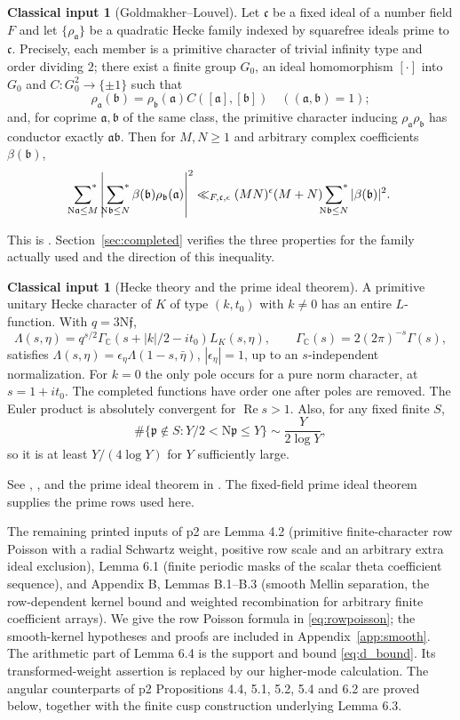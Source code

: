\documentclass[11pt,a4paper]{article}
\numberwithin{equation}{section}
\theoremstyle{definition}
\newtheorem{inputthm}[theorem]{Classical input}
\theoremstyle{remark}
\newcommand{\C}{\mathbb C}
\newcommand{\N}{\mathrm N}
\newcommand{\Rea}{\operatorname{Re}}
\newcommand{\sfstar}{\sideset{}{^*}\sum}
\newcommand{\GC}{\Gamma_{\C}}
\begin{document}
\begin{inputthm}[Goldmakher--Louvel]\label{inp:GL}
Let $\mathfrak c$ be a fixed ideal of a number field $F$ and let $\{\rho_{\mathfrak a}\}$ be a quadratic Hecke family indexed by squarefree ideals prime to $\mathfrak c$. Precisely, each member is a primitive character of trivial infinity type and order dividing $2$; there exist a finite group $G_0$, an ideal homomorphism $[\cdot]$ into $G_0$ and $C:G_0^2\to\{\pm1\}$ such that
\[
 \rho_{\mathfrak a}(\mathfrak b)=\rho_{\mathfrak b}(\mathfrak a)C([\mathfrak a],[\mathfrak b])\quad((\mathfrak a,\mathfrak b)=1);
\]
and, for coprime $\mathfrak a,\mathfrak b$ of the same class, the primitive character inducing $\rho_{\mathfrak a}\rho_{\mathfrak b}$ has conductor exactly $\mathfrak a\mathfrak b$. Then for $M,N\ge1$ and arbitrary complex coefficients $\beta(\mathfrak b)$,
\[
 \sfstar_{\N\mathfrak a\le M}\left|\sfstar_{\N\mathfrak b\le N}\beta(\mathfrak b)\rho_{\mathfrak b}(\mathfrak a)\right|^2
 \ll_{F,\mathfrak c,\epsilon}(MN)^\epsilon(M+N)\sfstar_{\N\mathfrak b\le N}|\beta(\mathfrak b)|^2.
\]
\end{inputthm}
This is \cite[Definition 1, Theorem 1.1]{GL}. Section~\ref{sec:completed} verifies the three properties for the family actually used and the direction of this inequality.

\begin{inputthm}[Hecke theory and the prime ideal theorem]\label{inp:Hecke}
A primitive unitary Hecke character of $K$ of type $(k,t_0)$ with $k\ne0$ has an entire $L$-function. With $q=3\N\mathfrak f$,
\[
 \Lambda(s,\eta)=q^{s/2}\GC(s+|k|/2-it_0)L_K(s,\eta),\qquad
 \GC(s)=2(2\pi)^{-s}\Gamma(s),
\]
satisfies $\Lambda(s,\eta)=\epsilon_\eta\Lambda(1-s,\bar\eta)$, $|\epsilon_\eta|=1$, up to an $s$-independent normalization. For $k=0$ the only pole occurs for a pure norm character, at $s=1+it_0$. The completed functions have order one after poles are removed. The Euler product is absolutely convergent for $\Rea s>1$. Also, for any fixed finite $S$,
\[
 \#\{\mathfrak p\notin S:Y/2<\N\mathfrak p\le Y\}\sim\frac{Y}{2\log Y},
\]
so it is at least $Y/(4\log Y)$ for $Y$ sufficiently large.
\end{inputthm}
See \cite{Hecke,Tate}, \cite[Section 5.3]{Watkins}, and the prime ideal theorem in \cite[Chapter 5]{IK}. The fixed-field prime ideal theorem supplies the prime rows used here.

The remaining printed inputs of p2 are Lemma 4.2 (primitive finite-character row Poisson with a radial Schwartz weight, positive row scale and an arbitrary extra ideal exclusion), Lemma 6.1 (finite periodic masks of the scalar theta coefficient sequence), and Appendix B, Lemmas B.1--B.3 (smooth Mellin separation, the row-dependent kernel bound and weighted recombination for arbitrary finite coefficient arrays). We give the row Poisson formula in \eqref{eq:rowpoisson}; the smooth-kernel hypotheses and proofs are included in Appendix~\ref{app:smooth}. The arithmetic part of Lemma 6.4 is the support and bound \eqref{eq:d_bound}. Its transformed-weight assertion is replaced by our higher-mode calculation. The angular counterparts of p2 Propositions 4.4, 5.1, 5.2, 5.4 and 6.2 are proved below, together with the finite cusp construction underlying Lemma 6.3.
\end{document}
